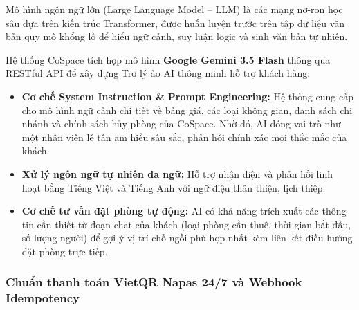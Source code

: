 Mô hình ngôn ngữ lớn (Large Language Model -- LLM) là các mạng nơ-ron học sâu dựa trên kiến trúc Transformer, được huấn luyện trước trên tập dữ liệu văn bản quy mô khổng lồ để hiểu ngữ cảnh, suy luận logic và sinh văn bản tự nhiên.

Hệ thống CoSpace tích hợp mô hình \textbf{Google Gemini 3.5 Flash} thông qua RESTful API để xây dựng Trợ lý ảo AI thông minh hỗ trợ khách hàng:
\begin{itemize}
    \item \textbf{Cơ chế System Instruction \& Prompt Engineering:} Hệ thống cung cấp cho mô hình ngữ cảnh chi tiết về bảng giá, các loại không gian, danh sách chi nhánh và chính sách hủy phòng của CoSpace. Nhờ đó, AI đóng vai trò như một nhân viên lễ tân am hiểu sâu sắc, phản hồi chính xác mọi thắc mắc của khách.
    \item \textbf{Xử lý ngôn ngữ tự nhiên đa ngữ:} Hỗ trợ nhận diện và phản hồi linh hoạt bằng Tiếng Việt và Tiếng Anh với ngữ điệu thân thiện, lịch thiệp.
    \item \textbf{Cơ chế tư vấn đặt phòng tự động:} AI có khả năng trích xuất các thông tin cần thiết từ đoạn chat của khách (loại phòng cần thuê, thời gian bắt đầu, số lượng người) để gợi ý vị trí chỗ ngồi phù hợp nhất kèm liên kết điều hướng đặt phòng trực tiếp.
\end{itemize}

\subsubsection{Chuẩn thanh toán VietQR Napas 24/7 và Webhook Idempotency}

